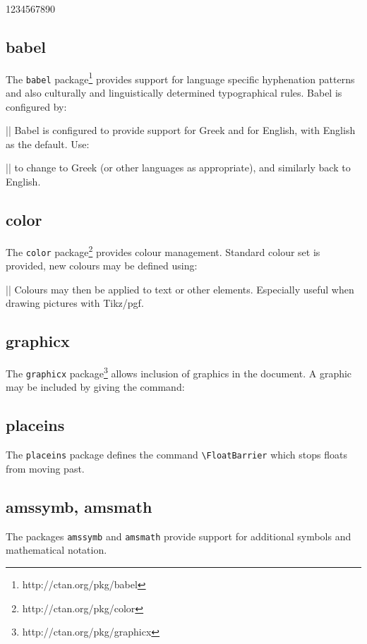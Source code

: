 \documentclass[electronic,timesopt]{adharticle} %
\begin{document}
1234567890

\subsection{babel}

The \texttt{babel} package\footnote{http://ctan.org/pkg/babel} provides support
for language specific hyphenation patterns and also culturally and
linguistically determined typographical rules. Babel is configured by:

\latex||
Babel is configured to provide support for Greek and for English, with English
as the default. Use:

\latex||
to change to Greek (or other languages as appropriate), and similarly back to
English.

\subsection{color}

The \texttt{color} package\footnote{http://ctan.org/pkg/color} provides colour
management. Standard colour set is provided, new colours may be defined using:

\latex||
Colours may then be applied to text or other elements. Especially useful when
drawing pictures with Tikz/pgf.

\subsection{graphicx}

The \texttt{graphicx} package\footnote{http://ctan.org/pkg/graphicx} allows
inclusion of graphics in the document. A graphic may be included by giving the
command:

\subsection{placeins}

The \texttt{placeins} package defines the command
\texttt{\textbackslash{}FloatBarrier} which stops floats from moving past.

\subsection{amssymb, amsmath}

The packages \texttt{amssymb} and \texttt{amsmath} provide support for
additional symbols and mathematical notation.
\end{document}
